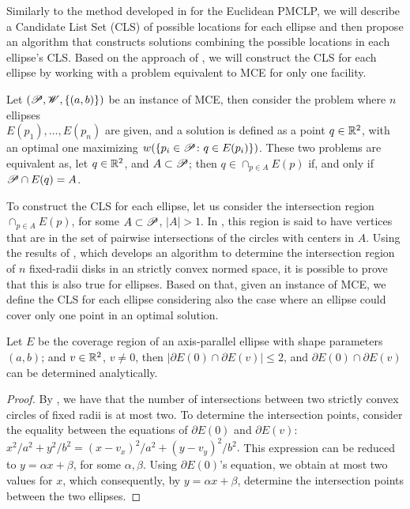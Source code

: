 Similarly to the method developed in \cite{church:1984} for the Euclidean PMCLP, we will describe a Candidate List Set (CLS) of possible locations for each ellipse and then propose an algorithm that constructs solutions combining the possible locations in each ellipse's CLS.
Based on the approach of \cite{chazelle:1986,cabello:2006}, we will construct the CLS for each ellipse by working with a problem equivalent to MCE for only one facility.

Let $(\mathscr{P}, \mathscr{W}, \{(a, b)\})$ be an instance of MCE, then consider the problem where $n$ ellipses\\ $E(p_1), \dots, E(p_n)$ are given, and a solution is defined as a point $q\in\mathbb{R}^2$, with an optimal one maximizing 
$w(\{p_i\in\mathscr{P} \colon q\in E(p_i)\})$.
These two problems are equivalent as, let $q\in\mathbb{R}^2$, and $A\subset\mathscr{P}$; then $q\in\cap_{p\in A}E(p)$ if, and only if $\mathscr{P} \cap E(q) = A$.

To construct the CLS for each ellipse, let us consider the intersection region $\cap_{p\in A} E(p)$, for some $A\subset \mathscr{P}$, $|A|>1$. In \cite{church:1984}, this region 
is said to have vertices that are in the set of pairwise intersections of the circles with centers in $A$.
Using the results of \cite{bi}, which develops an algorithm to determine the intersection region of $n$ fixed-radii disks in an strictly convex normed space, it is possible to prove that this is also true for ellipses. Based on that, given an instance of MCE, we define the CLS for each ellipse considering also the case where an ellipse could cover only one point in an optimal solution.

\begin{lem}\label{lema:e2p}
	Let $E$ be the coverage region of an axis-parallel ellipse with shape parameters $(a,b)$; and $v \in \mathbb{R}^2$, $v\neq0$, then $|\partial E(0) \cap \partial E(v)| \le 2$, and $\partial E(0) \cap \partial E(v)$ can be determined analytically.
\end{lem}

\begin{proof}
	By \cite{bi}, we have that the number of intersections between two strictly convex circles of fixed radii is at most two. To determine the intersection points, consider the equality between the equations of $\partial E(0)$ and $\partial E(v)$:
	$x^2/a^2 + y^2/b^2 = (x-v_x)^2/a^2 + (y-v_y)^2/b^2.$
	This expression can be reduced to $y=\alpha x + \beta$, for some $\alpha, \beta$. Using $\partial E(0)$'s equation, we obtain at most two values for $x$, which consequently, by $y=\alpha x + \beta$, determine the intersection points between the two ellipses.
\end{proof}


